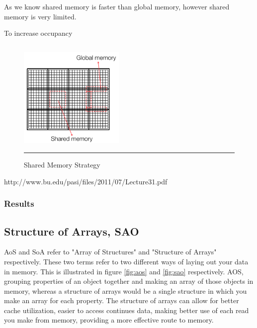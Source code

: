 As we know shared memory is faster than global memory, however shared memory is very limited. 

To increase occupancy

\begin{lstlisting}[language=C++, caption={Evaluation of individual coordinates of the Zhang and Li model}]


\end{lstlisting}


\begin{figure}[htbp]
	\centering
		\includegraphics[width=0.45\textwidth]{Figures/shared.png}
		\rule{35em}{0.2pt}
	\caption[Shared Memory Strategy]{Shared Memory Strategy }
	\label{fig:shared}
\end{figure}

http://www.bu.edu/pasi/files/2011/07/Lecture31.pdf


\subsubsection{Results}


\subsection{Structure of Arrays, SAO}


AoS and SoA refer to "Array of Structures" and "Structure of Arrays" respectively. These two terms refer to two different ways of laying out your data in memory. This is illustrated in figure \ref{fig:aos} and \ref{fig:sao} respectively. AOS, grouping properties of an object together and making an array of those objects in memory, whereas a structure of arrays would be a single structure in which you make an array for each property. The structure of arrays can allow for better cache utilization, easier to access continues data, making better use of each read you make from memory, providing a more effective route to memory. 

